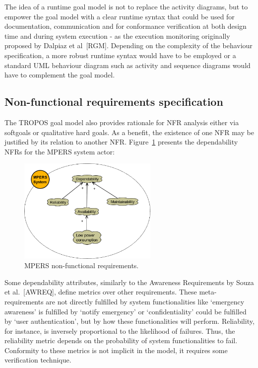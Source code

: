 The idea of a runtime goal model is not to replace the activity diagrams, but to empower the goal model with a clear runtime syntax that could be used for 
documentation, communication and for conformance verification at both design time and during system execution - as the execution monitoring originally proposed by Dalpiaz et al~[RGM]. Depending on the complexity of the behaviour specification, a more robust runtime syntax would have to be employed or a standard UML behaviour diagram such as activity and sequence diagrams would have to complement the goal model.

\subsection{Non-functional requirements specification}

The TROPOS goal model also provides rationale for NFR analysis either via softgoals or qualitative hard goals. As a benefit, the existence of one NFR may be justified by its relation to another NFR. Figure~\ref{fig:MPERS_NFR} presents the dependability NFRs for the MPERS system actor:

\begin{figure}[h!]
\centering
\includegraphics[width=0.6\textwidth]{imgs/MPERS_NFR.png}
\caption{MPERS non-functional requirements.}
\label{fig:MPERS_NFR}
\end{figure}

Some dependability attributes, similarly to the Awareness Requirements by Souza et al.~[AWREQ], define metrics over other requirements. These meta-requirements are not directly fulfilled by system functionalities like `emergency awareness' is fulfilled by `notify emergency' or `confidentiality' could be fulfilled by `user authentication', but by how these functionalities will perform. Reliability, for instance, is inversely proportional to the likelihood of failures. Thus, the reliability metric depends on the probability of system functionalities to fail. Conformity to these metrics is not implicit in the model, it requires some verification technique.


